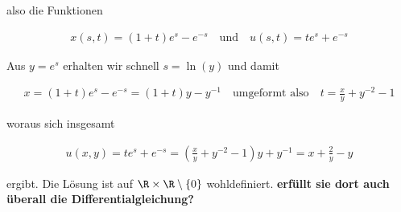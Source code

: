 \begin{solution}
also die Funktionen

\begin{align*}
    x(s,t) = (1 + t) e^s - e^{-s} \quad \text{und} \quad u(s,t) = t e^s + e^{-s}
\end{align*}

Aus $y = e^s$ erhalten wir schnell $s = \ln(y)$ und damit 

\begin{align*}
    x = (1+t) e^s - e^{-s} = (1 + t)y - y^{-1} \quad \text{umgeformt also} \quad t = \frac{x}{y} + y^{-2} - 1 
\end{align*}

woraus sich insgesamt

\begin{align*}
    u(x,y) = t e^s + e^{-s} = \left(\frac{x}{y} + y^{-2} - 1 \right) y + y^{-1} = x + \frac{2}{y} - y
\end{align*}

ergibt.
Die Lösung ist auf $\R \times \R \setminus \{0\}$ wohldefiniert.
\textbf{erfüllt sie dort auch überall die Differentialgleichung?}

\end{solution}


